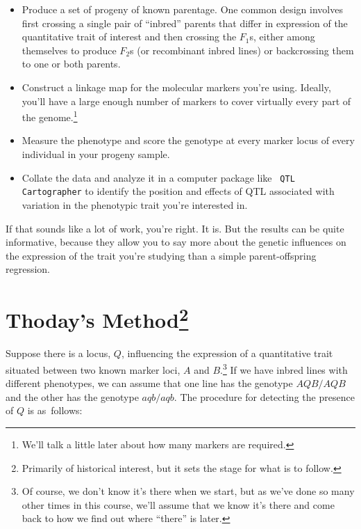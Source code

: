 \documentclass[12pt]{article}
\begin{document}
\begin{itemize}

\item Produce a set of progeny of known parentage. One common design
  involves first crossing a single pair of ``inbred'' parents that
  differ in expression of the quantitative trait of interest and then
  crossing the $F_1$s, either among themselves to produce $F_2$s (or
  recombinant inbred lines) or backcrossing them to one or both
  parents.

\item Construct a linkage map for the molecular markers you're
  using. Ideally, you'll have a large enough number of markers to
  cover virtually every part of the genome.\footnote{We'll talk a
    little later about how many markers are required.}

\item Measure the phenotype and score the genotype at every marker
  locus of every individual in your progeny sample.

\item Collate the data and analyze it in a computer package like {\tt
  QTL Cartographer} to identify the position and effects of QTL
  associated with variation in the phenotypic trait you're interested
  in.

\end{itemize}

\noindent If that sounds like a lot of work, you're right. It is. But
the results can be quite informative, because they allow you to say
more about the genetic influences on the expression of the trait
you're studying than a simple parent-offspring regression.

\section*{Thoday's Method\footnote{Primarily of historical
interest, but it sets the stage for what is to follow.}} 

Suppose there is a locus, $Q$, influencing the expression of a
quantitative trait situated between two known marker loci, $A$ and
$B$.\footnote{Of course, we don't know it's there when we start, but
  as we've done so many other times in this course, we'll assume that
  we know it's there and come back to how we find out where ``there''
  is later.} If we have inbred lines with different phenotypes, we can
assume that one line has the genotype $AQB/AQB$ and the other has the
genotype $aqb/aqb$. The procedure for detecting the presence of $Q$ is
as~follows:
\end{document}
